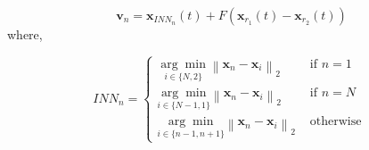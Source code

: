 \begin{equation}
\mathbf{v}_{n}=\mathbf{x}_{I N N_{n}}(t)+F\left(\mathbf{x}_{r_{1}}(t)-\mathbf{x}_{r_{2}}(t)\right)
\label{fINRAND1_equation}
\end{equation}
where,

$$
I N N_{n}=\left\{
\begin{array}{ll}
{\underset{i \in\{N, 2\}}{\arg \min} \left\|\mathbf{x}_{n}-\mathbf{x}_{i}\right\|_{2}} & {\text { if } n=1} \\
{\underset{i \in\{N-1,1\}}{\arg \min}\left\|\mathbf{x}_{n}-\mathbf{x}_{i}\right\|_{2}} & {\text { if } n=N} \\
{\underset{i \in\{n-1, n+1\}}{\arg \min}\left\|\mathbf{x}_{n}-\mathbf{x}_{i}\right\|_{2}} & {\text { otherwise }}
\end{array}
\right.
$$